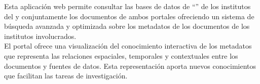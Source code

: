 Esta aplicación web permite consultar las bases de datos de ``\transmov'' de los institutos del   y  conjuntamente los documentos de ambos portales ofreciendo un sistema de búsqueda avanzada y optimizada sobre los \glspl{metadato} de los documentos de los institutos involucrados.\\

El portal ofrece una visualización del conocimiento interactiva de los \glspl{metadato}  que representa las relaciones espaciales, temporales y contextuales entre los documentos y fuentes de datos. Esta representación aporta nuevos conocimientos que facilitan las tareas de investigación.\\


